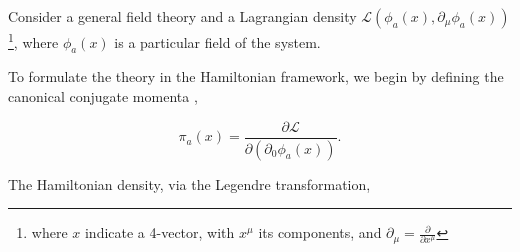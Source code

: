\documentclass[11pt,a4paper,twoside,pdf]{article}
\numberwithin{equation}{section}
\begin{document}

Consider a general field theory and a Lagrangian density 
$\mathcal{L}(\phi_a (x),\partial_\mu\phi_a (x))$\footnote{where $x$ indicate a 
4-vector, with $x^\mu$ its components, and $\partial_\mu = \frac{\partial}
{\partial x^\mu}$}, where $\phi_a (x)$ is a particular field of the system.

To formulate the theory in the Hamiltonian framework, we begin by 
defining the canonical conjugate momenta \cite{Peskin:1995ev},

\begin{equation}
    \pi_a (x) = \frac{\partial \mathcal{L}}{\partial (\partial_0 \phi_a (x))}.
\end{equation}

The Hamiltonian density, via the Legendre transformation,
\end{document}
